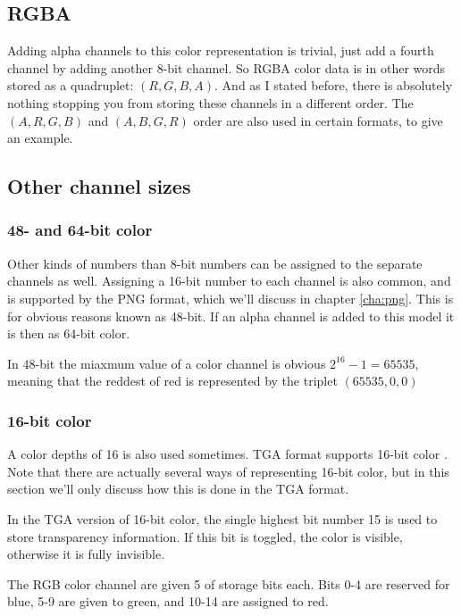 \subsection{RGBA}

Adding alpha channels to this color representation is trivial, just
add a fourth channel by adding another 8-bit channel. So RGBA color
data is in other words stored as a quadruplet: $(R,G,B,A)$. And as I
stated before, there is absolutely nothing stopping you from storing these
channels in a different order. The $(A,R,G,B)$ and $(A,B,G,R)$ order are also
used in certain formats, to give an example.

\subsection{Other channel sizes}

\subsubsection{48- and 64-bit color}

Other kinds of numbers than 8-bit numbers can be assigned to the
separate channels as well. Assigning a 16-bit number to each channel
is also common, and is supported by the PNG
format\cite{boutel:_png_portab_networ_graph_specif_version12}, which
we'll discuss in chapter \ref{cha:png}. This is for obvious reasons
known as 48-bit. If an alpha channel is added to this model it is then
as 64-bit color.

In 48-bit the miaxmum value of a color channel is obvious $2^{16} - 1
= 65535$, meaning that the reddest of red is represented by the
triplet $(65535, 0, 0)$

\subsubsection{16-bit color}

A color depths of 16 is also used sometimes. TGA format supports
16-bit color \cite{91:_truev_tga_file_format_specif}. Note that there
are actually several ways of representing 16-bit color, but in this
section we'll only discuss how this is done in the TGA format.

In the TGA version of 16-bit color, the single highest bit number 15 is used to
store transparency information. If this bit is toggled, the color is
visible, otherwise it is fully invisible.

The RGB color channel are given 5 of storage bits each. Bits 0-4 are
reserved for blue, 5-9 are given to green, and 10-14 are assigned to red.

